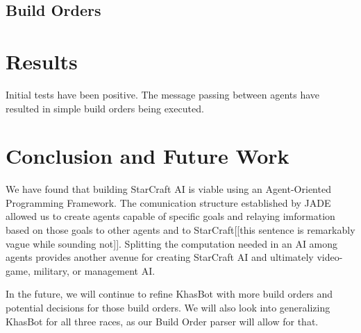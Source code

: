 \documentclass[letterpaper]{article}
\begin{document}
\subsection{Build Orders}

\section{Results}
Initial tests have been positive.  The message passing between agents have resulted in simple build orders being executed.

\section{Conclusion and Future Work}
We have found that building StarCraft AI is viable using an Agent-Oriented Programming Framework.  The comunication structure established by JADE allowed us to create agents capable of specific goals and relaying imformation based on those goals to other agents and to StarCraft[[this sentence is remarkably vague while sounding not]].  Splitting the computation needed in an AI among agents provides another avenue for creating StarCraft AI and ultimately video-game, military, or management AI.

In the future, we will continue to refine KhasBot with more build orders and potential decisions for those build orders.  We will also look into generalizing KhasBot for all three races, as our Build Order parser will allow for that.

{}

\end{document}
